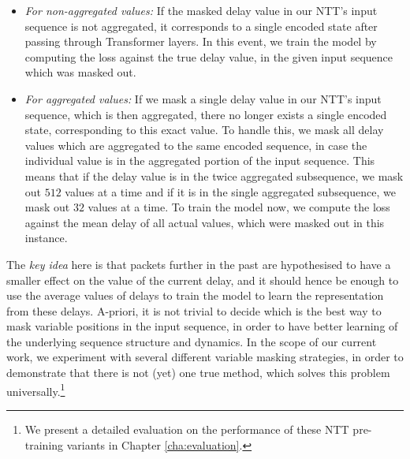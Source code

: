 \begin{itemize}
\item \emph{For non-aggregated values:} If the masked delay value in our NTT's input sequence is not aggregated, it corresponds to a single encoded state after passing through Transformer layers. In this event, we train the model by computing the loss against the true delay value, in the given input sequence which was masked out.
\item \emph{For aggregated values:} If we mask a single delay value in our NTT's input sequence, which is then aggregated, there no longer exists a single encoded state, corresponding to this exact value. To handle this, we mask all delay values which are aggregated to the same encoded sequence, in case the individual value is in the aggregated portion of the input sequence. This means that if the delay value is in the twice aggregated subsequence, we mask out $512$ values at a time and if it is in the single aggregated subsequence, we mask out $32$ values at a time. To train the model now, we compute the loss against the mean delay of all actual values, which were masked out in this instance.
\end{itemize}

The \emph{key idea} here is that packets further in the past are hypothesised to have a smaller effect on the value of the current delay, and it should hence be enough to use the average values of delays to train the model to learn the representation from these delays. A-priori, it is not trivial to decide which is the best way to mask variable positions in the input sequence, in order to have better learning of the underlying sequence structure and dynamics. In the scope of our current work, we experiment with several different variable masking strategies, in order to demonstrate that there is not (yet) one true method, which solves this problem universally.\footnote{We present a detailed evaluation on the performance of these NTT pre-training variants in Chapter \ref{cha:evaluation}.}











